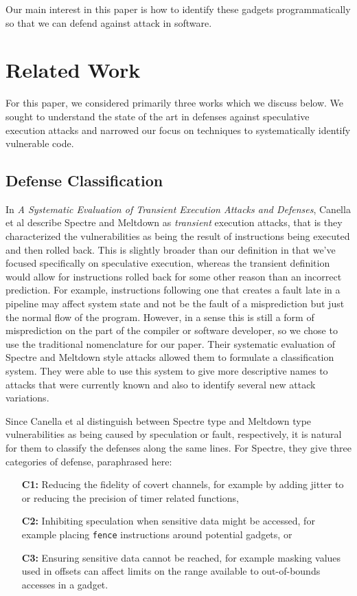 \documentclass[11pt,conference]{IEEEtran}
\begin{document}
Our main interest in this paper is how to identify these gadgets programmatically so that we can defend against attack in software.



\section{Related Work}\label{sec:related}
For this paper, we considered primarily three works which we discuss below.
We sought to understand the state of the art in defenses against speculative execution attacks and narrowed our focus on techniques to systematically identify vulnerable code.

\subsection{Defense Classification}
In \textit{A Systematic Evaluation of Transient Execution Attacks and Defenses}, Canella et al\cite{canella2019} describe Spectre and Meltdown as \emph{transient} execution attacks, that is they characterized the vulnerabilities as being the result of instructions being executed and then rolled back.
This is slightly broader than our definition in that we've focused specifically on speculative execution, whereas the transient definition would allow for instructions rolled back for some other reason than an incorrect prediction.
For example, instructions following one that creates a fault late in a pipeline may affect system state and not be the fault of a misprediction but just the normal flow of the program.
However, in a sense this is still a form of misprediction on the part of the compiler or software developer, so we chose to use the traditional nomenclature for our paper.
Their systematic evaluation of Spectre and Meltdown style attacks allowed them to formulate a classification system.
They were able to use this system to give more descriptive names to attacks that were currently known and also to identify several new attack variations.

Since Canella et al distinguish between Spectre type and Meltdown type vulnerabilities as being caused by speculation or fault, respectively, it is natural for them to classify the defenses along the same lines.
For Spectre, they give three categories of defense, paraphrased here:
\begin{enumerate}
	\item[\textbf{C1:}] Reducing the fidelity of covert channels, for example by adding jitter to or reducing the precision of timer related functions,
	\item[\textbf{C2:}] Inhibiting speculation when sensitive data might be accessed, for example placing \texttt{fence} instructions around potential gadgets, or
	\item[\textbf{C3:}] Ensuring sensitive data cannot be reached, for example masking values used in offsets can affect limits on the range available to out-of-bounds accesses in a gadget.
\end{enumerate}
\end{document}
